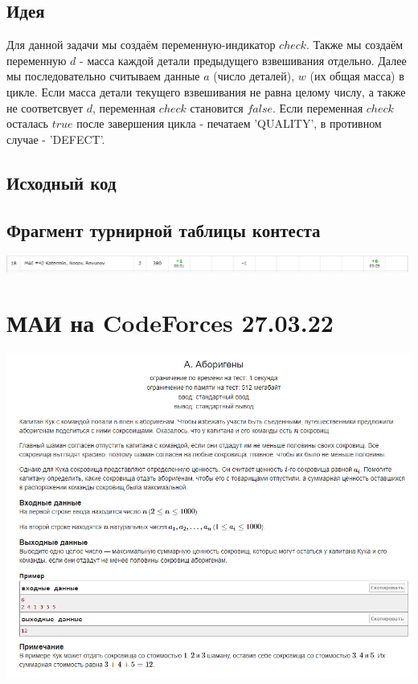 
\subsection*{Идея}
Для данной задачи мы создаём переменную-индикатор $check$. Также мы создаём переменную $d$ - масса каждой детали предыдущего взвешивания отдельно. Далее мы последовательно считываем данные $a$ (число деталей), $w$ (их общая масса) в цикле. Если масса детали текущего взвешивания не равна целому числу, а также не соответсвует $d$, переменная $check$ становится $false$. Если переменная $check$ осталась $true$ после завершения цикла -  печатаем 'QUALITY', в противном случае - 'DEFECT'.
\subsection*{Исходный код}

\subsection*{Фрагмент турнирной таблицы контеста}
\includegraphics[scale=0.5]{standings/2003.png}\newline\noindent
\pagebreak

\section*{МАИ на CodeForces 27.03.22}
\includegraphics[scale=0.7]{statements/2703_A.png}\newline\noindent

